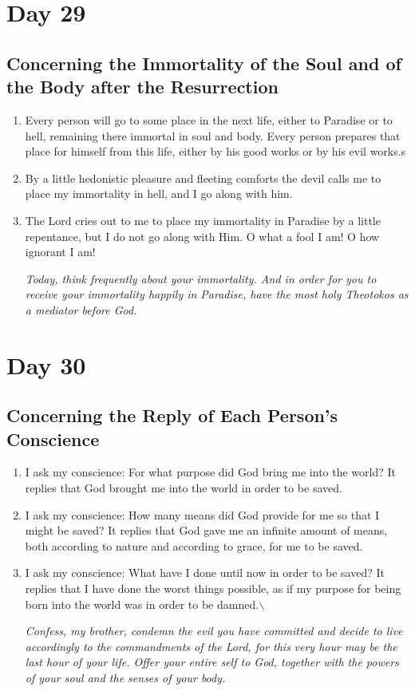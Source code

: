 \documentclass[11pt]{article}
\begin{document}
\section*{Day 29}
\label{sec:orgc3308b7}
\subsection*{Concerning the Immortality of the Soul and of the Body after the Resurrection}
\label{sec:org0d69c15}
\begin{enumerate}
\item Every person will go to some place in the next life, either to Paradise or to hell, remaining there immortal in soul and body. Every person prepares that place for himself from this life, either by his good works or by his evil works.s
\item By a little hedonistic pleasure and fleeting comforts the devil calls me to place my immortality in hell, and I go along with him.
\item The Lord cries out to me to place my immortality in Paradise by a little repentance, but I do not go along with Him. O what a fool I am! O how ignorant I am!

\emph{Today, think frequently about your immortality. And in order for you to receive your immortality happily in Paradise, have the most holy Theotokos as a mediator before God.}
\end{enumerate}
\section*{Day 30}
\label{sec:org5971d34}
\subsection*{Concerning the Reply of Each Person's Conscience}
\label{sec:org5febbff}
\begin{enumerate}
\item I ask my conscience: For what purpose did God bring me into the world? It replies that God brought me into the world in order to be saved.
\item I ask my conscience: How many means did God provide for me so that I might be saved? It replies that God gave me an infinite amount of means, both according to nature and according to grace, for me to be saved.
\item I ask my conscience: What have I done until now in order to be saved? It replies that I have done the worst things possible, as if my purpose for being born into the world was in order to be damned.$\backslash$

\emph{Confess, my brother, condemn the evil you have committed and decide to live accordingly to the commandments of the Lord, for this}
\emph{very hour may be the last hour of your life. Offer your entire self to God, together with the powers of your soul and the senses of your body.}
\end{enumerate}
\end{document}
